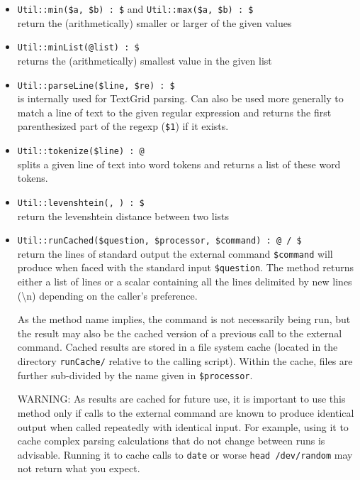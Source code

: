 \documentclass[a4,twoside=off,draft=true]{scrartcl}
\begin{document}
\begin{itemize}
\item {\tt Util::min(\$a, \$b) :\ \$} and {\tt Util::max(\$a, \$b) :\ \$}\\
 return the (arithmetically) smaller or larger of the given values
\item {\tt Util::minList(@list) :\ \$}\\
 returns the (arithmetically) smallest value in the given list
\item {\tt Util::parseLine(\$line, \$re) :\ \$}\\
 is internally used for TextGrid parsing. Can also be used more generally
 to match a line of text to the given regular expression and returns 
 the first parenthesized part of the regexp ({\tt \$1}) if it exists.
\item {\tt Util::tokenize(\$line) :\ @}\\
 splits a given line of text into word tokens and returns a list of these word tokens. 
\item {\tt Util::levenshtein(, ) :\ \$}\\
 return the levenshtein distance between two lists
\item {\tt Util::runCached(\$question, \$processor, \$command) :\ @ / \$}\\
 return the lines of standard output the external command {\tt \$command} will produce 
 when faced with the standard input {\tt \$question}. The method returns either a list
 of lines or a scalar containing all the lines delimited by new lines (\textbackslash{n})
 depending on the caller's preference.

 As the method name implies, the command is not necessarily being run, but
 the result may also be the cached version of a previous call to the external command.
 Cached results are stored in a file system cache (located in the directory {\tt runCache/} 
 relative to the calling script). Within the cache, files are further sub-divided by the
 name given in {\tt \$processor}. 

 WARNING: As results are cached for future use, it is important to use this method only if
 calls to the external command are known to produce identical output when called
 repeatedly with identical input.
 For example, using it to cache complex parsing calculations that do not change between runs
 is advisable. Running it to cache calls to {\tt date} or worse {\tt head /dev/random} may 
 not return what you expect.
\end{itemize}
\end{document}
